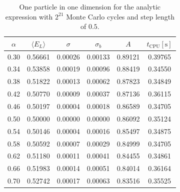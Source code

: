 \documentclass[
    a4paper, aps, twocolumn, floatfix, superscriptaddress, nofootinbib]{revtex4-1}
\newcommand{\1}{\mathds{1}}
\begin{document}
    \begin{table}
        \centering
        \caption{One particle in one dimension for the analytic expression with
        $2^{21}$ Monte Carlo cycles and step length of $0.5$.}
        \begin{ruledtabular}
            \begin{tabular}{cccccc}
                $\alpha$ & $\langle  E_L\rangle$ & $\sigma$ & $\sigma_b$ & $A$
                & $t_{\text{CPU}} [\si{\second}]$ \\
                \hline
                0.30&0.56661&0.00026&0.00133&0.89121&0.39765\\
                0.34&0.53858&0.00019&0.00096&0.88419&0.34550\\
                0.38&0.51822&0.00013&0.00062&0.87823&0.34849\\
                0.42&0.50770&0.00009&0.00037&0.87136&0.36115\\
                0.46&0.50197&0.00004&0.00018&0.86589&0.34705\\
                0.50&0.50000&0.00000&0.00000&0.86092&0.35124\\
                0.54&0.50146&0.00004&0.00016&0.85497&0.34875\\
                0.58&0.50592&0.00007&0.00029&0.84999&0.34705\\
                0.62&0.51180&0.00011&0.00041&0.84455&0.34861\\
                0.66&0.51983&0.00014&0.00051&0.84014&0.36164\\
                0.70&0.52742&0.00017&0.00063&0.83516&0.35525\\
            \end{tabular}
        \end{ruledtabular}
        \label{tab:1D1N_analytic}
    \end{table}
\end{document}
